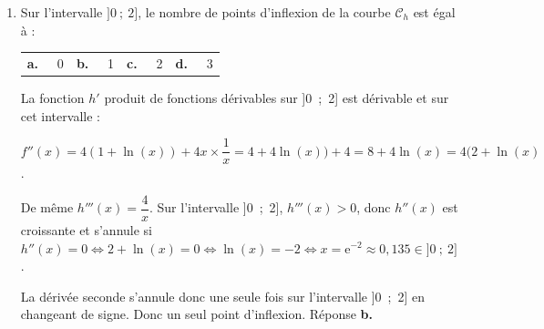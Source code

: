 \documentclass[10pt]{article}
\begin{document}
\begin{enumerate}[resume]
$\bullet~~$$h'\left(\sqrt{\text{e}}\right)  = 4 \times \sqrt{\text{e}}\left(1 + \ln \left(\sqrt{\text{e}}\right)\right) = 4 \times \sqrt{\text{e}} \times \left(1 + \dfrac12\right) = 6\sqrt{\text{e}}$.

$\bullet~~$$h\left(\sqrt{\text{e}}\right) = \left(\sqrt{\text{e}}\right)^2\left(1 + 2 \ln \left(\sqrt{\text{e}}\right)\right) = \text{e}\ln \left(1 +  2 \times \dfrac12\ln \text{e}\right) = \text{e}\times (1 + 1) = 2\text{e}$.

L'équation de la tangente s'écrit donc :

$y - 2\text{e} = 6\sqrt{\text{e}}\left(x - \sqrt{\text{e}}\right) \iff y = 2\text{e} + 6x\sqrt{\text{e}} - 6\text{e}\iff y = 6x\sqrt{\text{e}} - 4\text{e}$. Réponse \textbf{d.}

\item Sur l'intervalle $]0~;~2]$, le nombre de points d'inflexion de la courbe $\mathcal{C}_h$ est égal à :

\begin{center}
\begin{tabularx}{\linewidth}{*{4}{X}}
\textbf{a.~~} 0&\textbf{b.~~} 1 &\textbf{c.~~} 2 &\textbf{d.~~} 3
\end{tabularx}
\end{center}

La fonction $h'$ produit de fonctions dérivables sur ]0~;~2] est dérivable et sur cet intervalle :

$f''(x) = 4(1 + \ln (x)) + 4x \times \dfrac{1}{x} = 4 + 4\ln (x)) + 4 = 8 + 4\ln (x) = 4(2 + \ln (x)$.

De même $h'''(x) = \dfrac{4}{x}$. Sur l'intervalle ]0~;~2], $h'''(x) > 0$, donc $h''(x)$ est croissante et s'annule si $h''(x) = 0 \iff 2 + \ln (x) = 0 \iff \ln (x) = - 2 \iff x = \text{e}^{-2} \approx 0,135 \in ]0~;~2]$.

La dérivée seconde s'annule donc une seule fois sur l'intervalle ]0~;~2] en changeant de signe. Donc un seul point d'inflexion. Réponse \textbf{b.}
\end{enumerate}

\bigskip
\end{document}
